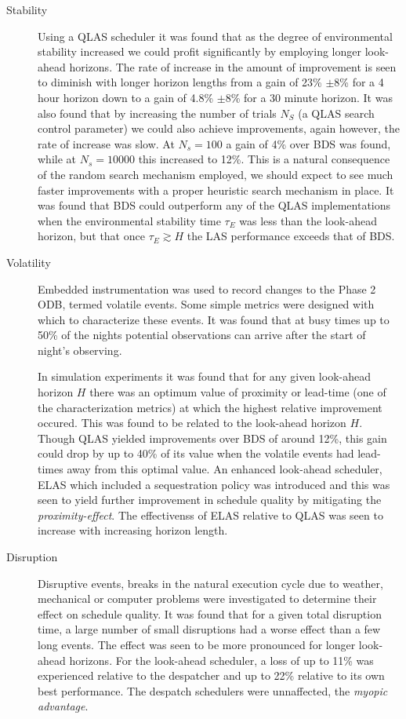 \begin{description}
 \item[Stability]
Using a QLAS scheduler it was found that as the degree of environmental stability increased we could profit significantly by employing longer look-ahead horizons. The rate of increase in the amount of improvement is seen to diminish with longer horizon lengths from a gain of 23\% $\pm 8$\% for a 4 hour horizon down to a gain of 4.8\% $\pm 8$\% for a 30 minute horizon. It was also found that by increasing the number of trials $N_S$ (a QLAS search control parameter) we could also achieve improvements, again however, the rate of increase was slow. At $N_s = 100$ a gain of 4\% over BDS was found, while at $N_s=10000$ this increased to 12\%. This is a natural consequence of the random search mechanism employed, we should expect to see much faster improvements with a proper heuristic search mechanism in place. It was found that BDS could outperform any of the QLAS implementations when the environmental stability time $\tau_E$ was less than the look-ahead horizon, but that once $\tau_E \apprge H$ the LAS performance exceeds that of BDS. 

 \item[Volatility]
Embedded instrumentation was used to record changes to the Phase 2 ODB, termed volatile events. Some simple metrics were designed with which to characterize these events. It was found that at busy times up to 50\% of the nights potential observations can arrive after the start of night's observing.

In simulation experiments it was found that for any given look-ahead horizon $H$ there was an optimum value of proximity or lead-time (one of the characterization metrics) at which the highest relative improvement occured. This was found to be related to the look-ahead horizon $H$. Though QLAS yielded improvements over BDS of around 12\%, this gain could drop by up to 40\% of its value when the volatile events had lead-times away from this optimal value. An enhanced look-ahead scheduler, ELAS which included a sequestration policy was introduced and this was seen to yield further improvement in schedule quality by mitigating the \emph{proximity-effect}. The effectivenss of ELAS relative to QLAS was seen to increase with increasing horizon length.

\item[Disruption]
Disruptive events, breaks in the natural execution cycle due to weather, mechanical or computer problems were investigated to determine their effect on schedule quality. It was found that for a given total disruption time, a large number of small disruptions had a worse effect than a few long events. The effect was seen to be more pronounced for longer look-ahead horizons. For the look-ahead scheduler, a loss of up to 11\% was experienced relative to the despatcher and up to 22\% relative to its own best performance. The despatch schedulers were unnaffected, the \emph{myopic advantage}. 


\end{description}
